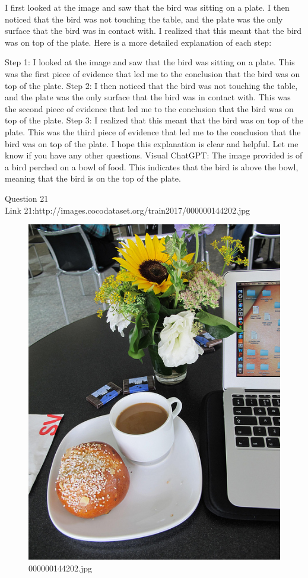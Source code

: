 \begin{enumerate}
        I first looked at the image and saw that the bird was sitting on a plate.
        I then noticed that the bird was not touching the table, and the plate was the only surface that the bird was in contact with.
        I realized that this meant that the bird was on top of the plate.
        Here is a more detailed explanation of each step:

        Step 1: I looked at the image and saw that the bird was sitting on a plate. This was the first piece of evidence that led me to the conclusion that the bird was on top of the plate.
        Step 2: I then noticed that the bird was not touching the table, and the plate was the only surface that the bird was in contact with. This was the second piece of evidence that led me to the conclusion that the bird was on top of the plate.
        Step 3: I realized that this meant that the bird was on top of the plate. This was the third piece of evidence that led me to the conclusion that the bird was on top of the plate.
        I hope this explanation is clear and helpful. Let me know if you have any other questions.
        \subitem Visual ChatGPT: The image provided is of a bird perched on a bowl of food. This indicates that the bird is above the bowl, meaning that the bird is on the top of the plate.
    \end{enumerate}
Question 21\\
Link 21:http://images.cocodataset.org/train2017/000000144202.jpg
    \begin{figure}[h]
        \centering
        \includegraphics[width=0.8\linewidth]{../image set/easy/000000144202.jpg}
        \caption{000000144202.jpg}
    \end{figure}
